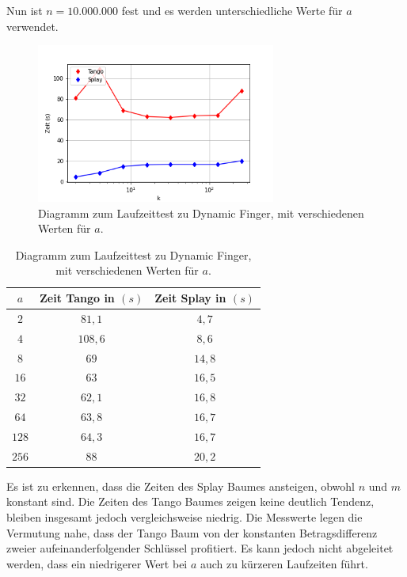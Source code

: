 \documentclass[a4paper,12pt]{article}
\begin{document}
\noindent Nun ist $n = 10.000.000$ fest und es werden unterschiedliche Werte für $a$ verwendet.

\begin{figure}[H]
	\centering
	\includegraphics[width=0.7\textwidth]{Medien/laufzeittest/diagramm/dynamicfingerNfest}
	\caption{Diagramm zum Laufzeittest zu Dynamic Finger, mit verschiedenen Werten für $a$.}
\end{figure}
\begin{table}[H]
	\begin{center}
		\begin{tabular}[c]{|c|c|c|}
			\hline
			$a$ & Zeit Tango in $\left(s\right)$ &Zeit Splay in $\left(s\right)$ \\
			\hline
			$2$ & $81,1$ &$4,7$ \\
			\hline
			$4$  & $108,6$ &$8,6$  \\
			\hline
			$8$  & $69$ &$14,8$  \\
			\hline
			$16$  & $63$ &$16,5$  \\
			\hline
			$32$  & $62,1$ &$16,8$  \\
			\hline
			$64$  & $63,8$ &$16,7$  \\
			\hline
			$128$  & $64,3$ &$16,7$  \\
			\hline
			$256$  & $88$ &$20,2$  \\
			\hline
		\end{tabular}
		\caption{Diagramm zum Laufzeittest zu Dynamic Finger, mit verschiedenen Werten für $a$.} 
	\end{center}
\end{table}\noindent Es ist zu erkennen, dass die Zeiten des Splay Baumes ansteigen, obwohl $n$ und $m$ konstant sind. Die Zeiten des Tango Baumes zeigen keine deutlich Tendenz, bleiben insgesamt jedoch vergleichsweise niedrig. Die Messwerte legen die Vermutung nahe, dass der Tango Baum von der konstanten Betragsdifferenz zweier aufeinanderfolgender Schlüssel profitiert. Es kann jedoch nicht abgeleitet werden, dass ein niedrigerer Wert bei $a$ auch zu kürzeren Laufzeiten führt.  
\end{document}
